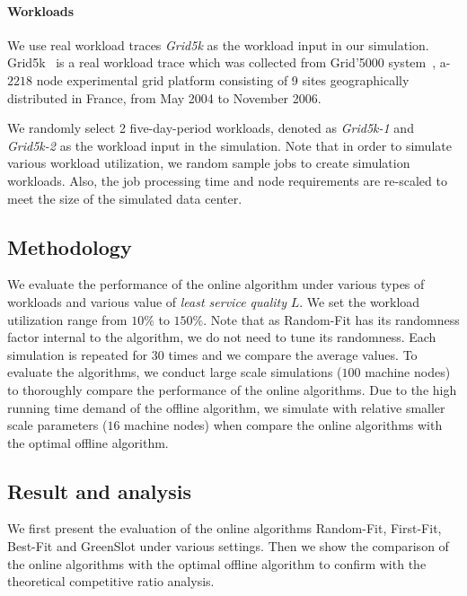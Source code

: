 \documentclass[conference]{IEEEtran}
\begin{document}
\paragraph*{Workloads}

We use real workload traces \emph{Grid5k} as the workload input in our simulation. Grid5k~\cite{Grid5k} is a real workload trace which was collected from Grid'5000 system~\cite{Grid5000Platform}, a-$2218$ node experimental grid platform consisting of 9 sites geographically distributed in France, from May 2004 to November 2006.

We randomly select 2 five-day-period workloads, denoted as \emph{Grid5k-1} and \emph{Grid5k-2} as the workload input in the simulation. Note that in order to simulate various workload utilization, we random sample jobs to create simulation workloads. Also, the job processing time and node requirements are re-scaled to meet the size of the simulated data center.







\subsection{Methodology}

We evaluate the performance of the online algorithm under various types of workloads and various value of \emph{least service quality} $L$. We set the workload utilization range from $10\%$ to $150\%$. Note that as Random-Fit has its randomness factor internal to the algorithm, we do not need to tune its randomness. Each simulation is repeated for $30$ times and we compare the average values. To evaluate the algorithms, we conduct large scale simulations ($100$ machine nodes) to thoroughly compare the performance of the online algorithms. Due to the high running time demand of the offline algorithm, we simulate with relative smaller scale parameters ($16$ machine nodes) when compare the online algorithms with the optimal offline algorithm.



\subsection{Result and analysis}

We first present the evaluation of the online algorithms Random-Fit, First-Fit, Best-Fit and GreenSlot under various settings. Then we show the comparison of the online algorithms with the optimal offline algorithm to confirm with the theoretical competitive ratio analysis.
\end{document}
